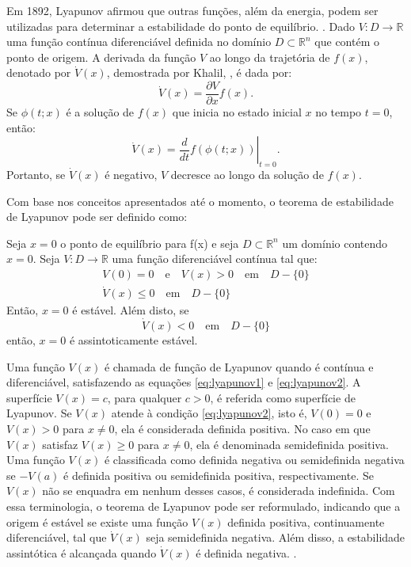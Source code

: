 Em 1892, Lyapunov afirmou que outras funções, além da energia, podem ser utilizadas para determinar a estabilidade do ponto de equilíbrio. \cite{lyapunov1892}. Dado $V : D \rightarrow \mathbb{R}$ uma função contínua diferenciável definida no domínio $D \subset \mathbb{R}^n$ que contém o ponto de origem. A derivada da função $V$ ao longo da trajetória de $f(x)$, denotado por $\dot{V}(x)$, demostrada por Khalil, \cite{khalil2002}, é dada por: \begin{equation} \dot{V}(x) = \frac{\partial V}{\partial x}f(x). \end{equation} Se $\phi(t;x)$ é a solução de $f(x)$ que inicia no estado inicial $x$ no tempo $t = 0$, então: \begin{equation} \dot{V}(x) = \left. \frac{d}{dt}f(\phi(t;x))\right|_{t=0}. \end{equation} Portanto, se $\dot{V}(x)$ é negativo, $V$ decresce ao longo da solução de $f(x)$.

Com base nos conceitos apresentados até o momento, o teorema de estabilidade de Lyapunov pode ser definido como:

\begin{theorem}
  Seja $x = 0$ o ponto de equilíbrio para f(x) e seja $D \subset \mathbb{R}^n$ um domínio contendo $x = 0$. Seja $V : D \rightarrow \mathbb{R}$ uma função diferenciável contínua tal que:
  \begin{gather}
    V(0) = 0 \quad \text{e} \quad V(x) > 0 \quad \mathrm{em} \quad D - \{0\} \label{eq:lyapunov1} \\
    \dot{V}(x) \leq 0 \quad \mathrm{em} \quad D - \{0\} \label{eq:lyapunov2}
  \end{gather}
  Então, $x=0$ é estável. Além disto, se
  \begin{equation}
    \dot{V}(x) < 0 \quad \mathrm{em} \quad D - \{0\} \label{eq:lyapunov3}
  \end{equation}
  então, $x=0$ é assintoticamente estável.
\end{theorem}

Uma função $V(x)$ é chamada de função de Lyapunov quando é contínua e diferenciável, satisfazendo as equações \eqref{eq:lyapunov1} e \eqref{eq:lyapunov2}. A superfície $V(x) = c$, para qualquer $c > 0$, é referida como superfície de Lyapunov. Se $V(x)$ atende à condição \eqref{eq:lyapunov2}, isto é, $V(0) = 0$ e $V(x) > 0$ para $x \neq 0$, ela é considerada definida positiva. No caso em que $V(x)$ satisfaz $V(x) \geq 0$ para $x \neq 0$, ela é denominada semidefinida positiva. Uma função $V(x)$ é classificada como definida negativa ou semidefinida negativa se $-V(a)$ é definida positiva ou semidefinida positiva, respectivamente. Se $V(x)$ não se enquadra em nenhum desses casos, é considerada indefinida. Com essa terminologia, o teorema de Lyapunov pode ser reformulado, indicando que a origem é estável se existe uma função $V(x)$ definida positiva, continuamente diferenciável, tal que $\dot{V}(x)$ seja semidefinida negativa. Além disso, a estabilidade assintótica é alcançada quando $\dot{V}(x)$ é definida negativa. \cite{khalil2002}.

